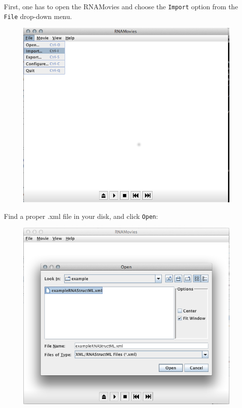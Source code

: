 \documentclass[12pt]{article}
\begin{document}
First, one has to open the RNAMovies and choose the \texttt{Import} option from the \texttt{File} drop-down menu. 
\begin{figure}[h!]
\centering
\includegraphics[scale=0.4]{./pictures/RNAmovies_1.png}
\end{figure}
\newpage
Find a proper .xml file in your disk, and click \texttt{Open}:
\begin{figure}[h!]
\centering
\includegraphics[scale=0.4]{./pictures/RNAmovies_2.png}
\end{figure}
\end{document}

